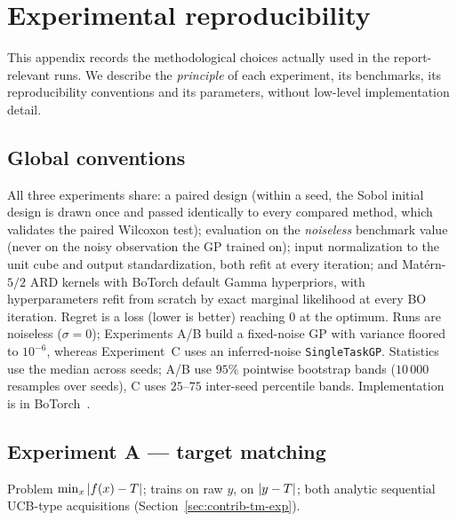 \section{Experimental reproducibility}
\label{app:exp}

This appendix records the methodological choices actually used in the
report-relevant runs. We describe the \emph{principle} of each experiment, its
benchmarks, its reproducibility conventions and its parameters, without
low-level implementation detail.

\subsection{Global conventions}

All three experiments share: a paired design (within a seed, the Sobol initial
design is drawn once and passed identically to every compared method, which
validates the paired Wilcoxon test); evaluation on the \emph{noiseless} benchmark
value (never on the noisy observation the GP trained on); input normalization to
the unit cube and output standardization, both refit at every iteration; and
Mat\'ern-$5/2$ ARD kernels with BoTorch default Gamma hyperpriors, with
hyperparameters refit from scratch by exact marginal likelihood at every BO
iteration. Regret is a loss (lower is better) reaching $0$ at the optimum. Runs
are noiseless ($\sigma=0$); Experiments A/B build a fixed-noise GP with variance
floored to $10^{-6}$, whereas Experiment~C uses an inferred-noise
\texttt{SingleTaskGP}. Statistics use the median across seeds; A/B use $95\%$
pointwise bootstrap bands ($10\,000$ resamples over seeds), C uses $25$--$75$
inter-seed percentile bands. Implementation is in BoTorch~\cite{balandat2020botorch}.

\subsection{Experiment A --- target matching}

Problem $\min_x\left\lvert f(x)-T\right\rvert$; \RIGHT{} trains on raw $y$, \WRONG{} on
$\left\lvert y-T\right\rvert$; both analytic sequential UCB-type acquisitions
(Section~\ref{sec:contrib-tm-exp}).

